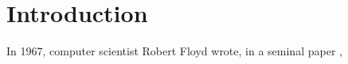 \section{Introduction}
In 1967, computer scientist Robert Floyd wrote, in a seminal paper
\cite{floyd-meaning}, 

